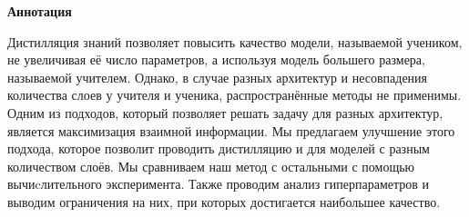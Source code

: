 \begin{center}
    \Large{\textbf{Аннотация}}
\end{center}

Дистилляция знаний позволяет повысить качество модели, называемой учеником, не увеличивая её число параметров,
а используя модель большего размера, называемой учителем.
Однако, в случае разных архитектур и несовпадения количества слоев у учителя и ученика, распространённые методы не применимы.
Одним из подходов, который позволяет решать задачу для разных архитектур, является максимизация взаимной информации.
Мы предлагаем улучшение этого подхода, которое позволит проводить дистилляцию и для моделей с разным количеством слоёв.
Мы сравниваем наш метод с остальными с помощью вычиcлительного эксперимента.
Также проводим анализ гиперпараметров и выводим ограничения на них, при которых достигается наибольшее качество.